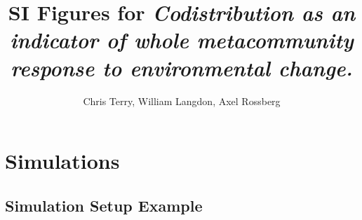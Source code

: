 \documentclass[
]{article}
\title{SI Figures for \emph{Codistribution as an indicator of whole
metacommunity response to environmental change.}}
\author{Chris Terry, William Langdon, Axel Rossberg}
\date{}
\begin{document}
\maketitle

{
\setcounter{tocdepth}{2}
\tableofcontents
}
\newpage

\hypertarget{simulations}{%
\section{Simulations}\label{simulations}}

\hypertarget{simulation-setup-example}{%
\subsection{Simulation Setup Example}\label{simulation-setup-example}}
\end{document}

